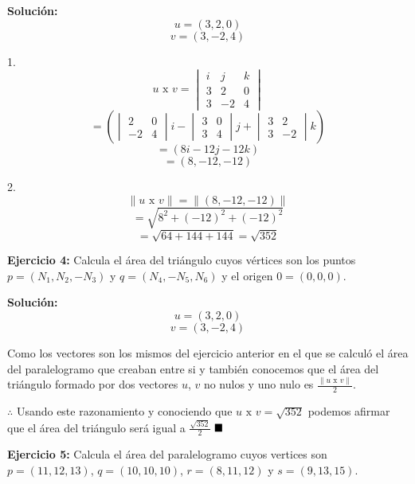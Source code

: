 \documentclass{article}
\begin{document}
\textbf{Solución:}
$$u =(3, 2, 0)$$
$$v = (3,-2, 4)$$
\vspace{10pt}

\begin{minipage}[c]{0.5cm}
    1.
    $$u \text{ x } v =\begin{vmatrix}
        i & j & k \\
        3 & 2 & 0 \\
        3 & -2 & 4
    \end{vmatrix}$$
    $$= \left(\begin{vmatrix}
        2 & 0 \\
        -2 & 4
    \end{vmatrix}i - \begin{vmatrix}
        3 & 0 \\
        3 & 4 
    \end{vmatrix}j + \begin{vmatrix}
        3 & 2 \\
        3 & -2
    \end{vmatrix}k\right)$$
    $$= (8i -12j -12k)$$
    $$=(8, -12, -12)$$
\end{minipage}\hspace*{7cm}\begin{minipage}[c]{0.5cm}
    2. 
    $$\|u \text{ x } v\| = \|(8,-12,-12)\|$$
    $$ = \sqrt{8^2+(-12)^2+(-12)^2}$$
    $$=\sqrt{64 + 144+144} = \sqrt{352}$$
\end{minipage}
\vspace{10pt}

\textbf{Ejercicio 4:} Calcula el área del triángulo cuyos vértices son los puntos $p = (N_1, N_2, -N_3)$ y 
$q = (N_4, -N_5, N_6)$ y el origen $0 = (0,0,0)$. 
\vspace{10pt}

\textbf{Solución:}
$$u =(3, 2, 0)$$
$$v = (3,-2, 4)$$

Como los vectores son los mismos del ejercicio anterior en el que se calculó el área del paralelogramo que creaban entre si y 
también conocemos que el área del triángulo formado por dos vectores $u$, $v$ no nulos y uno nulo es $\frac{\|u \text{ x }v\|}{2}$.

$\therefore$ Usando este razonamiento y conociendo que $u \text{ x } v = \sqrt{352}$ podemos afirmar que el área del triángulo será igual a 
$\frac{\sqrt{352}}{2}$
$\hfill\blacksquare$
\vspace{10pt}

\textbf{Ejercicio 5:} Calcula el área del paralelogramo cuyos vertices son $p=(11,12,13)$, $q= (10, 10,10 )$, $r= (8,11,12)$ y 
$s = (9, 13,15)$. 
\vspace{10pt}
\end{document}
